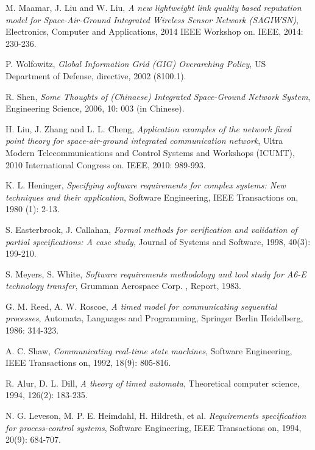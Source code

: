 
\begin{thebibliography}{2}
	\setlength{\baselineskip}{25pt}
	
	M. Maamar, J. Liu and W. Liu, \emph{A new lightweight link quality based reputation model for Space-Air-Ground Integrated Wireless Sensor Network (SAGIWSN)}, Electronics, Computer and Applications, 2014 IEEE Workshop on. IEEE, 2014: 230-236.
	
	P. Wolfowitz, \emph{Global Information Grid (GIG) Overarching Policy}, US Department of Defense, directive, 2002 (8100.1).
	
	R. Shen, \emph{Some Thoughts of (Chinaese) Integrated Space-Ground Network System}, Engineering Science, 2006, 10: 003 (in Chinese).
	
	H. Liu, J. Zhang and L. L. Cheng, \emph{Application examples of the network fixed point theory for space-air-ground integrated communication network}, Ultra Modern Telecommunications and Control Systems and Workshops (ICUMT), 2010 International Congress on. IEEE, 2010: 989-993.
	
	K. L. Heninger, \emph{Specifying software requirements for complex systems: New techniques and their application}, Software Engineering, IEEE Transactions on, 1980 (1): 2-13.
	
	S. Easterbrook, J. Callahan, \emph{Formal methods for verification and validation of partial specifications: A case study}, Journal of Systems and Software, 1998, 40(3): 199-210.
	
	S. Meyers, S. White, \emph{Software requirements methodology and tool study for A6-E technology transfer}, Grumman Aerospace Corp. , Report, 1983.
	
	G. M. Reed, A. W. Roscoe, \emph{A timed model for communicating sequential processes}, Automata, Languages and Programming, Springer Berlin Heidelberg, 1986: 314-323.
	
	A. C. Shaw, \emph{Communicating real-time state machines}, Software Engineering, IEEE Transactions on, 1992, 18(9): 805-816.
	
	R. Alur, D. L. Dill, \emph{A theory of timed automata}, Theoretical computer science, 1994, 126(2): 183-235.
	
	N. G. Leveson, M. P. E. Heimdahl, H. Hildreth, et al. \emph{Requirements specification for process-control systems}, Software Engineering, IEEE Transactions on, 1994, 20(9): 684-707.
	

\end{thebibliography}
